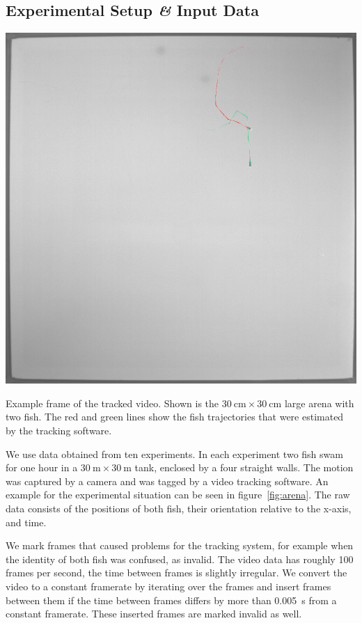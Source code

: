 \documentclass[nobib]{tufte-handout}
\begin{document}
\subsection{Experimental Setup \textit{\&} Input Data}
\begin{marginfigure}
\includegraphics[width=\columnwidth]{tracked_frame}
\caption{Example frame of the tracked video.
  Shown is the \(\SI{30}{\cm} \times \SI{30}{\cm}\) large arena with two fish.
  The red and green lines show the fish trajectories that were estimated by the tracking software.
\label{fig:arena}}
\end{marginfigure}
We use data obtained from ten experiments.
In each experiment two fish swam for one hour in a \(\SI{30}{\m} \times \SI{30}{\m}\) tank, enclosed by a four straight walls.
The motion was captured by a camera and was tagged by a video tracking software.
An example for the experimental situation can be seen in figure~\ref{fig:arena}.
The raw data consists of the positions of both fish, their orientation relative to the x-axis, and time.


We mark frames that caused problems for the tracking system, for example when the identity of both fish was confused, as invalid.
The video data has roughly 100 frames per second, the time between frames is slightly irregular.
We convert the video to a constant framerate by iterating over the frames and insert frames between them if the time between frames differs by more than \SI{0.005}{\s} from a constant framerate.
These inserted frames are marked invalid as well.
\end{document}
